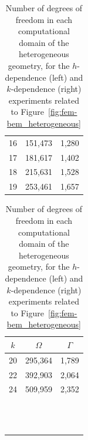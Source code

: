 \documentclass[a4paper,11pt]{article}
\begin{document}
\begin{appendix}
\begin{table}[ht]
{\begin{tabular}{l|cc}
    16                              & 151,473    & 1,280      \\
    17                              & 181,617    & 1,402      \\
    18                              & 215,631    & 1,528      \\
    19                              & 253,461    & 1,657      \\
  \end{tabular}
  \hspace{0.2cm}
  \begin{tabular}{lcc}
    \multicolumn{1}{c|}{\(k\)} & \(\Omega\) & \(\Gamma\) \\ \hline
    \multicolumn{1}{l|}{20}         & 295,364    & 1,789      \\
    \multicolumn{1}{l|}{22}         & 392,903    & 2,064      \\
    \multicolumn{1}{l|}{24}         & 509,959    & 2,352      \\
    && \\
    && \\
    && \\
    && \\
    && \\
    && \\
    && \\
    && \\
    && \\
    && \\
    && \\
    &&
  \end{tabular}
  }
  \caption{Number of degrees of freedom in each computational domain of the heterogeneous geometry, for the \(h\)-dependence (left) and \(k\)-dependence (right) experiments related to Figure~\ref{fig:fem-bem_heterogeneous}}
  \label{table:dof_heterogeneous}
\end{table}



\end{appendix}
\end{document}
